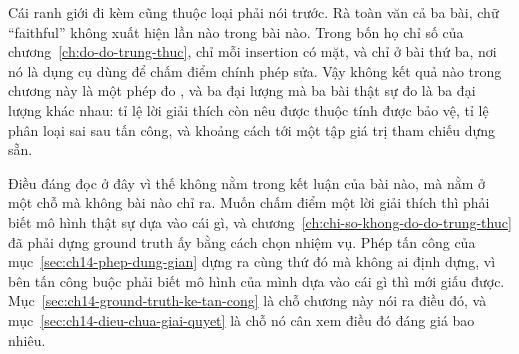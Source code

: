 Cái ranh giới đi kèm cũng thuộc loại phải nói trước. Rà toàn văn cả ba bài, chữ
\enquote{faithful} không xuất hiện lần nào trong bài nào. Trong bốn họ chỉ số
của chương~\ref{ch:do-do-trung-thuc}, chỉ mỗi insertion có mặt, và chỉ ở bài
thứ ba, nơi nó là dụng cụ dùng để chấm điểm chính phép sửa. Vậy không kết quả
nào trong chương này là một phép đo , và ba đại
lượng mà ba bài thật sự đo là ba đại lượng khác nhau: tỉ lệ lời giải thích còn
nêu được thuộc tính được bảo vệ, tỉ lệ phân loại sai sau tấn công, và khoảng
cách tới một tập giá trị tham chiếu dựng sẵn.

Điều đáng đọc ở đây vì thế không nằm trong kết luận của bài nào, mà nằm ở một
chỗ mà không bài nào chỉ ra. Muốn chấm điểm một lời giải thích thì phải biết mô
hình thật sự dựa vào cái gì, và chương~\ref{ch:chi-so-khong-do-do-trung-thuc}
đã phải dựng ground truth ấy bằng cách chọn nhiệm vụ. Phép tấn công của
mục~\ref{sec:ch14-phep-dung-gian} dựng ra cùng thứ đó mà không ai định dựng, vì
bên tấn công buộc phải biết mô hình của mình dựa vào cái gì thì mới giấu được.
Mục~\ref{sec:ch14-ground-truth-ke-tan-cong} là chỗ chương này nói ra điều đó,
và mục~\ref{sec:ch14-dieu-chua-giai-quyet} là chỗ nó cân xem điều đó đáng giá
bao nhiêu.









